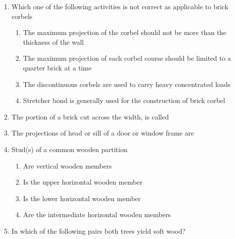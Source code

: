 \documentclass[11pt,a4paper]{article}
\begin{document}
\begin{enumerate}
\begin{enumerate*}[itemjoin=\qquad, label=\Alph*.]
\item{80 cm}
\item{90 cm}
\end{enumerate*}
\item{Which one of the following activities is not correct as applicable to brick corbels}
\begin{enumerate}[label=\Alph*.]
\item{The maximum projection of the corbel should not be more than the thickness of the wall}
\item{The maximum projection of each corbel course should be limited to a quarter brick at a time}
\item{The discontinuous corbels are used to carry heavy concentrated loads}
\item{Stretcher bond is generally used for the construction of brick corbel}
\end{enumerate}
\item{The portion of a brick cut across the width, is called}
\\
\item{The projections of head or sill of a door or window frame are}
\\
\item{Stud(s) of a common wooden partition}
\begin{enumerate}[label=\Alph*.]
\item{Are vertical wooden members}
\item{Is the upper horizontal wooden member}
\item{Is the lower horizontal wooden member}
\item{Are the intermediate horizontal wooden members}
\end{enumerate}
\item{In which of the following pairs both trees yield soft wood?}

\end{enumerate}
\end{document}
